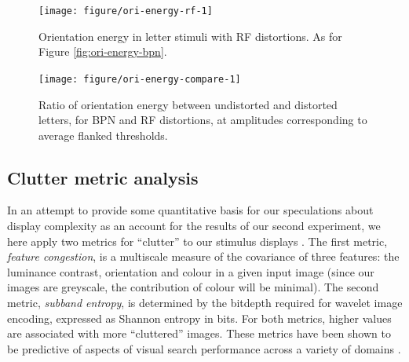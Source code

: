 \documentclass[doc, 11pt,a4paper,natbib]{apa6}\usepackage[]{graphicx}\usepackage[]{color}
\newenvironment{knitrout}{}{} %
\begin{document}
\begin{knitrout}
\color{fgcolor}\begin{figure}
\texttt{[image: figure/ori-energy-rf-1]} \caption{Orientation energy in letter stimuli with RF distortions.
              As for Figure \ref{fig:ori-energy-bpn}.}\label{fig:ori-energy-rf}
\end{figure}


\end{knitrout}



\begin{knitrout}
\color{fgcolor}\begin{figure}
\texttt{[image: figure/ori-energy-compare-1]} \caption[Ratio of orientation energy between undistorted and distorted letters,
               for BPN and RF distortions, at amplitudes corresponding to average flanked thresholds]{Ratio of orientation energy between undistorted and distorted letters,
               for BPN and RF distortions, at amplitudes corresponding to average flanked thresholds.}\label{fig:ori-energy-compare}
\end{figure}


\end{knitrout}

\subsection{Clutter metric analysis}

In an attempt to provide some quantitative basis for our speculations about display complexity as an account for the results of our second experiment, we here apply two metrics for ``clutter'' to our stimulus displays \citep{rosenholtz_measuring_2007}.
The first metric, \textit{feature congestion}, is a multiscale measure of the covariance of three features: the luminance contrast, orientation and colour in a given input image (since our images are greyscale, the contribution of colour will be minimal).
The second metric, \textit{subband entropy}, is determined by the bitdepth required for wavelet image encoding, expressed as Shannon entropy in bits.
For both metrics, higher values are associated with more ``cluttered'' images.
These metrics have been shown to be predictive of aspects of visual search performance across a variety of domains \citep{asher_regional_2013, henderson_influence_2009, rosenholtz_measuring_2007}.
\end{document}
